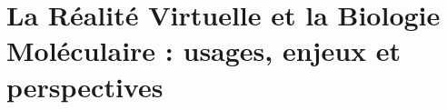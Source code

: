 
\chapter[La Réalité Virtuelle et la Biologie Moléculaire : usages, enjeux et perspectives]{La Réalité Virtuelle et la Biologie Moléculaire : usages, enjeux et perspectives}
\label{Sec:RV}
\minitoc
\cleardoublepage







